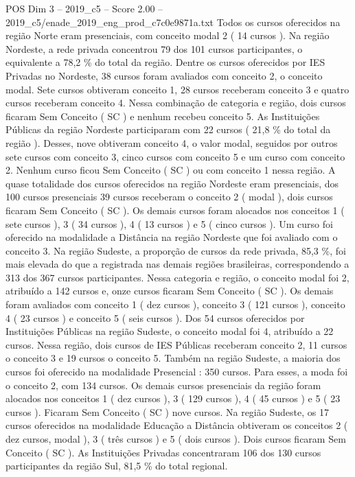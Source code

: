 \begin{textsample}{POS Dim 3 – 2019\_c5 – Score 2.00 – 2019\_c5/enade\_2019\_eng\_prod\_c7c0e9871a.txt}
Todos os cursos oferecidos na região Norte eram presenciais, com conceito modal 2 ( 14 cursos ).
Na região Nordeste, a rede privada concentrou 79 dos 101 cursos participantes, o equivalente a 78,2 \% do total da região.
Dentre os cursos oferecidos por IES Privadas no Nordeste, 38 cursos foram avaliados com conceito 2, o conceito modal.
Sete cursos obtiveram conceito 1, 28 cursos receberam conceito 3 e quatro cursos receberam conceito 4.
Nessa combinação de categoria e região, dois cursos ficaram Sem Conceito ( SC ) e nenhum recebeu conceito 5.
As Instituições Públicas da região Nordeste participaram com 22 cursos ( 21,8 \% do total da região ).
Desses, nove obtiveram conceito 4, o valor modal, seguidos por outros sete cursos com conceito 3, cinco cursos com conceito 5 e um curso com conceito 2.
Nenhum curso ficou Sem Conceito ( SC ) ou com conceito 1 nessa região.
A quase totalidade dos cursos oferecidos na região Nordeste eram presenciais, dos 100 cursos presenciais 39 cursos receberam o conceito 2 ( modal ), dois cursos ficaram Sem Conceito ( SC ).
Os demais cursos foram alocados nos conceitos 1 ( sete cursos ), 3 ( 34 cursos ), 4 ( 13 cursos ) e 5 ( cinco cursos ).
Um curso foi oferecido na modalidade a Distância na região Nordeste que foi avaliado com o conceito 3.
Na região Sudeste, a proporção de cursos da rede privada, 85,3 \%, foi mais elevada do que a registrada nas demais regiões brasileiras, correspondendo a 313 dos 367 cursos participantes.
Nessa categoria e região, o conceito modal foi 2, atribuído a 142 cursos e, onze cursos ficaram Sem Conceito ( SC ).
Os demais foram avaliados com conceito 1 ( dez cursos ), conceito 3 ( 121 cursos ), conceito 4 ( 23 cursos ) e conceito 5 ( seis cursos ).
Dos 54 cursos oferecidos por Instituições Públicas na região Sudeste, o conceito modal foi 4, atribuído a 22 cursos.
Nessa região, dois cursos de IES Públicas receberam conceito 2, 11 cursos o conceito 3 e 19 cursos o conceito 5.
Também na região Sudeste, a maioria dos cursos foi oferecido na modalidade Presencial : 350 cursos.
Para esses, a moda foi o conceito 2, com 134 cursos.
Os demais cursos presenciais da região foram alocados nos conceitos 1 ( dez cursos ), 3 ( 129 cursos ), 4 ( 45 cursos ) e 5 ( 23 cursos ).
Ficaram Sem Conceito ( SC ) nove cursos.
Na região Sudeste, os 17 cursos oferecidos na modalidade Educação a Distância obtiveram os conceitos 2 ( dez cursos, modal ), 3 ( três cursos ) e 5 ( dois cursos ).
Dois cursos ficaram Sem Conceito ( SC ).
As Instituições Privadas concentraram 106 dos 130 cursos participantes da região Sul, 81,5 \% do total regional.

\end{textsample}
